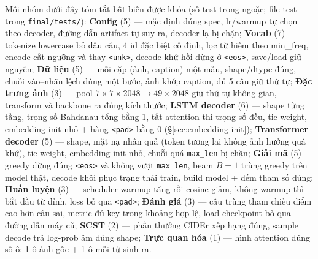 Mỗi nhóm dưới đây tóm tắt bất biến được khóa (số test trong ngoặc; file test
trong \texttt{final/tests/}): \textbf{Config} (5) --- mặc định đúng spec,
lr/warmup tự chọn theo decoder, đường dẫn artifact tự suy ra, decoder lạ bị
chặn; \textbf{Vocab} (7) --- tokenize lowercase bỏ dấu câu, 4 id đặc biệt cố
định, lọc từ hiếm theo min\_freq, encode cắt ngưỡng và thay \texttt{<unk>},
decode khứ hồi dừng ở \texttt{<eos>}, save/load giữ nguyên; \textbf{Dữ liệu}
(5) --- mỗi cặp (ảnh, caption) một mẫu, shape/dtype đúng, chuỗi vào--nhãn lệch
đúng một bước, ảnh khớp caption, đủ 5 câu giữ thứ tự; \textbf{Đặc trưng ảnh}
(3) --- pool $7\times7\times2048 \to 49\times2048$ giữ thứ tự không gian,
transform và backbone ra đúng kích thước; \textbf{LSTM decoder} (6) --- shape
từng tầng, trọng số Bahdanau tổng bằng 1, tắt attention thì trọng số đều, tie
weight, embedding init nhỏ + hàng \texttt{<pad>} bằng 0
(\S\ref{sec:embedding-init}); \textbf{Transformer decoder} (5) --- shape, mặt
nạ nhân quả (token tương lai không ảnh hưởng quá khứ), tie weight, embedding
init nhỏ, chuỗi quá \texttt{max\_len} bị chặn; \textbf{Giải mã} (5) --- greedy
dừng đúng \texttt{<eos>} và không vượt \texttt{max\_len}, beam $B{=}1$ trùng
greedy trên model thật, decode khôi phục trạng thái train, build model + đếm
tham số đúng; \textbf{Huấn luyện} (3) --- scheduler warmup tăng rồi cosine
giảm, không warmup thì bắt đầu từ đỉnh, loss bỏ qua \texttt{<pad>};
\textbf{Đánh giá} (3) --- câu trùng tham chiếu điểm cao hơn câu sai, metric đủ
key trong khoảng hợp lệ, load checkpoint bỏ qua đường dẫn máy cũ; \textbf{SCST}
(2) --- phần thưởng CIDEr xếp hạng đúng, sample decode trả log-prob âm đúng
shape; \textbf{Trực quan hóa} (1) --- hình attention đúng số ô: 1 ô ảnh gốc +
1 ô mỗi từ sinh ra.
